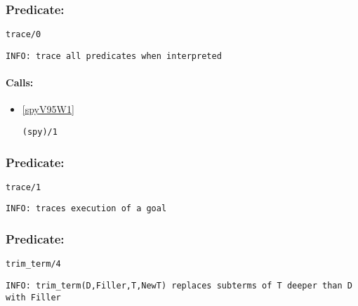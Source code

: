 \subsubsection{Predicate:} \label{traceV95W0}

\begin{verbatim}
trace/0
\end{verbatim}

{\small \begin{verbatim}
INFO: trace all predicates when interpreted

\end{verbatim}}
\paragraph{Calls:} 
\begin{itemize}
\item \ref{spyV95W1} 
\begin{verbatim}
(spy)/1
\end{verbatim}

\end{itemize}

\subsubsection{Predicate:} \label{traceV95W1}

\begin{verbatim}
trace/1
\end{verbatim}

{\small \begin{verbatim}
INFO: traces execution of a goal

\end{verbatim}}

\subsubsection{Predicate:} \label{trimV95WtermV95W4}

\begin{verbatim}
trim_term/4
\end{verbatim}

{\small \begin{verbatim}
INFO: trim_term(D,Filler,T,NewT) replaces subterms of T deeper than D with Filler

\end{verbatim}}
